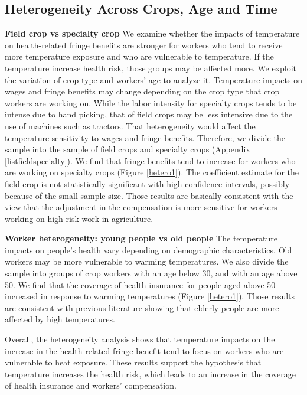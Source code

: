 \documentclass[12pt]{article}
\begin{document}
\subsection{Heterogeneity Across Crops, Age and Time}
\vspace{0.5cm}
\noindent \textbf{Field crop vs specialty crop} We examine whether the impacts of temperature on health-related fringe benefits are stronger for workers who tend to receive more temperature exposure and who are vulnerable to temperature. If the temperature increase health risk, those groups may be affected more. We exploit the variation of crop type and workers' age to analyze it. Temperature impacts on wages and fringe benefits may change depending on the crop type that crop workers are working on. While the labor intensity for specialty crops tends to be intense due to hand picking, that of field crops may be less intensive due to the use of machines such as tractors. That heterogeneity would affect the temperature sensitivity to wages and fringe benefits. Therefore, we divide the sample into the sample of field crops and specialty crops (Appendix \ref{listfieldspecialty}). 
We find that fringe benefits tend to increase for workers who are working on specialty crops (Figure \ref{hetero1}). The coefficient estimate for the field crop is not statistically significant with high confidence intervals, possibly because of the small sample size. Those results are basically consistent with the view that the adjustment in the compensation is more sensitive for workers working on high-risk work in agriculture. 


\vspace{0.5cm}
\noindent \textbf{Worker heterogeneity: young people vs old people}
The temperature impacts on people's health vary depending on demographic characteristics. Old workers may be more vulnerable to warming temperatures. We also divide the sample into groups of crop workers with an age below 30, and with an age above 50. We find that the coverage of health insurance for people aged above 50 increased in response to warming temperatures (Figure \ref{hetero1}). Those results are consistent with previous literature showing that elderly people are more affected by high temperatures. 

Overall, the heterogeneity analysis shows that temperature impacts on the increase in the health-related fringe benefit tend to focus on workers who are vulnerable to heat exposure. These results support the hypothesis that temperature increases the health risk, which leads to an increase in the coverage of health insurance and workers' compensation. 
\end{document}
